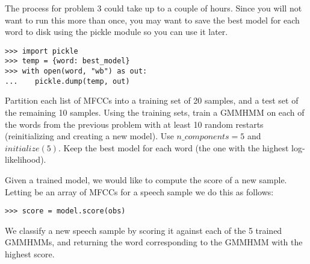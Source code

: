 
\begin{warn}
The process for problem 3 could take up to a couple of hours. 
Since you will not want to run this
more than once, you may want to save the best model for each word to disk using the pickle
module so you can use it later.
\begin{lstlisting}
>>> import pickle
>>> temp = {word: best_model}
>>> with open(word, "wb") as out:
...    pickle.dump(temp, out)
\end{lstlisting}
\end{warn}

\begin{problem}
Partition each list of MFCCs into a training set of 20 samples, and a test set of
the remaining 10 samples.
Using the training sets, train a GMMHMM on each of the words from the previous problem
with at least 10 random restarts (reinitializing and creating a new model).
Use $n\_components=5$ and $initialize(5)$.  
Keep the best model for each word (the one with the highest
log-likelihood). 
\end{problem}

Given a trained model, we would like to compute the score of a new sample.
Letting  be an array of MFCCs for a speech sample we do this as follows:
\begin{lstlisting}
>>> score = model.score(obs)
\end{lstlisting}
We classify a new speech sample by scoring it against each of the 5 trained GMMHMMs, and returning the word corresponding to the GMMHMM with the highest score.



